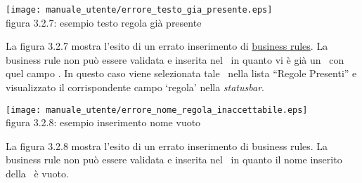 \begin{center}
\texttt{[image: manuale\_utente/errore\_testo\_gia\_presente.eps]}\\
 figura 3.2.7: esempio testo regola gi\`a presente
\end{center} 
La figura 3.2.7 mostra l'esito di un errato inserimento di \underline{business rules}. La business rule non pu\`o essere validata e inserita nel \rp\ in quanto vi \`e gi\`a un \br\ con quel campo . In questo caso viene selezionata tale \br\ nella lista ``Regole Presenti'' e visualizzato il corrispondente campo `regola' nella \textit{statusbar}.

\begin{center}
\texttt{[image: manuale\_utente/errore\_nome\_regola\_inaccettabile.eps]}\\
 figura 3.2.8: esempio inserimento nome vuoto
\end{center} 
La figura 3.2.8 mostra l'esito di un errato inserimento di business rules. La business rule non pu\`o essere validata e inserita nel \rp\ in quanto il nome inserito  della \br\ \`e vuoto.

